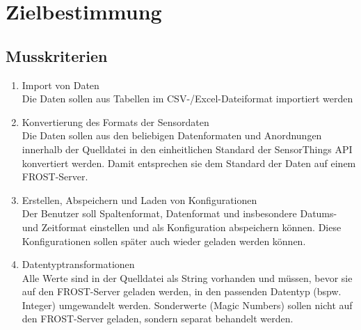 \documentclass[a4paper, 12 pt]{article}
\begin{document}
\newpage
\section{Zielbestimmung}
	\subsection{Musskriterien}
	\begin{enumerate}
	\item Import von Daten \\
	Die Daten sollen aus Tabellen im CSV-/Excel-Dateiformat importiert werden
	\item Konvertierung des Formats der Sensordaten \\
	Die Daten sollen aus den beliebigen Datenformaten und Anordnungen innerhalb der Quelldatei in den einheitlichen Standard der SensorThings API konvertiert werden.
	Damit entsprechen sie dem Standard der Daten auf einem FROST-Server.
	\item Erstellen, Abspeichern und Laden von Konfigurationen \\
	Der Benutzer soll Spaltenformat, Datenformat und insbesondere Datums- und Zeitformat einstellen und als Konfiguration abspeichern können.
	Diese Konfigurationen sollen später auch wieder geladen werden können.
	\item Datentyptransformationen \\
	Alle Werte sind in der Quelldatei als String vorhanden und müssen, bevor sie auf den FROST-Server geladen werden, in den passenden Datentyp (bspw. Integer) umgewandelt werden.
	Sonderwerte (Magic Numbers) sollen nicht auf den FROST-Server geladen, sondern separat behandelt werden.
	\end{enumerate}
\end{document}
